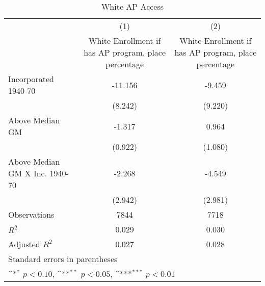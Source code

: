 \begin{table}[htbp]\centering
\def\sym#1{\ifmmode^{#1}\else\(^{#1}\)\fi}
\caption{White AP Access}
\begin{tabular}{l*{2}{c}}
\hline\hline
                    &\multicolumn{1}{c}{(1)}&\multicolumn{1}{c}{(2)}\\
                    &\multicolumn{1}{c}{White Enrollment if has AP program, place percentage}&\multicolumn{1}{c}{White Enrollment if has AP program, place percentage}\\
\hline
Incorporated 1940-70&     -11.156         &      -9.459         \\
                    &     (8.242)         &     (9.220)         \\
[1em]
Above Median GM     &      -1.317         &       0.964         \\
                    &     (0.922)         &     (1.080)         \\
[1em]
Above Median GM X Inc. 1940-70&      -2.268         &      -4.549         \\
                    &     (2.942)         &     (2.981)         \\
\hline
Observations        &        7844         &        7718         \\
\(R^{2}\)           &       0.029         &       0.030         \\
Adjusted \(R^{2}\)  &       0.027         &       0.028         \\
\hline\hline
\multicolumn{3}{l}{\footnotesize Standard errors in parentheses}\\
\multicolumn{3}{l}{\footnotesize \sym{*} \(p<0.10\), \sym{**} \(p<0.05\), \sym{***} \(p<0.01\)}\\
\end{tabular}
\end{table}
